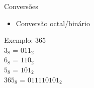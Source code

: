 

\begin{frame}{Conversões}
    \begin{itemize}
        \item Conversão octal/binário
    \end{itemize}
    Exemplo: 365 \\[0.2cm]
    \centering
    $3_{8}$ = $011_{2}$ \\[0.2cm]
    $6_{8}$ = $110_{2}$ \\[0.2cm]
    $5_{8}$ = $101_{2}$ \\[0.2cm]
    $365_{8}$ = $011110101_{2}$
\end{frame}
